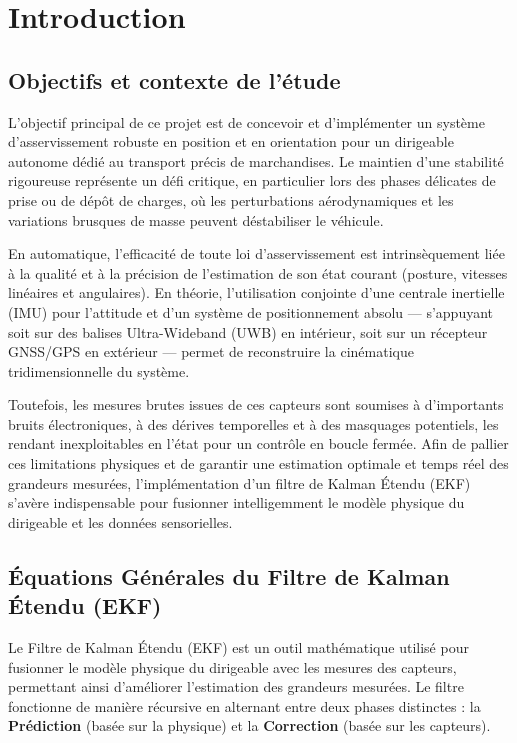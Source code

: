 \documentclass[../Formulations_Kalman.tex]{subfiles}
\begin{document}
\section{Introduction}

\subsection{Objectifs et contexte de l'étude}
L'objectif principal de ce projet est de concevoir et d'implémenter un système d'asservissement robuste en position et en orientation pour un dirigeable autonome dédié au transport précis de marchandises. Le maintien d'une stabilité rigoureuse représente un défi critique, en particulier lors des phases délicates de prise ou de dépôt de charges, où les perturbations aérodynamiques et les variations brusques de masse peuvent déstabiliser le véhicule. 

En automatique, l'efficacité de toute loi d'asservissement est intrinsèquement liée à la qualité et à la précision de l'estimation de son état courant (posture, vitesses linéaires et angulaires). En théorie, l'utilisation conjointe d'une centrale inertielle (IMU) pour l'attitude et d'un système de positionnement absolu — s'appuyant soit sur des balises Ultra-Wideband (UWB) en intérieur, soit sur un récepteur GNSS/GPS en extérieur — permet de reconstruire la cinématique tridimensionnelle du système. 

Toutefois, les mesures brutes issues de ces capteurs sont soumises à d'importants bruits électroniques, à des dérives temporelles et à des masquages potentiels, les rendant inexploitables en l'état pour un contrôle en boucle fermée. Afin de pallier ces limitations physiques et de garantir une estimation optimale et temps réel des grandeurs mesurées, l'implémentation d'un filtre de Kalman Étendu (EKF) s'avère indispensable pour fusionner intelligemment le modèle physique du dirigeable et les données sensorielles.

\subsection{Équations Générales du Filtre de Kalman Étendu (EKF)}
Le Filtre de Kalman Étendu (EKF) est un outil mathématique utilisé pour fusionner le modèle physique du dirigeable avec les mesures des capteurs, permettant ainsi d'améliorer l'estimation des grandeurs mesurées. Le filtre fonctionne de manière récursive en alternant entre deux phases distinctes : la \textbf{Prédiction} (basée sur la physique) et la \textbf{Correction} (basée sur les capteurs).
\end{document}
